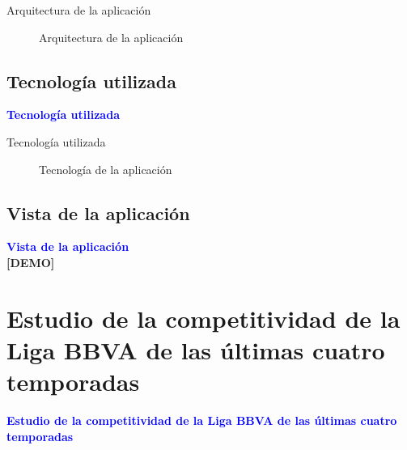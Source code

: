 \documentclass[10pt]{beamer}
\begin{document}
	\begin{frame}{Arquitectura de la aplicación}
		\begin{figure}
			\centering
			\resizebox{!}{0.7\textheight}{\arquitectura}
			\caption{Arquitectura de la aplicación}
			\label{fig:arquitectura}
		\end{figure}
	\end{frame}
	
	\subsection{Tecnología utilizada}
	
	\begin{frame}
		\begin{center}
			\Huge\textbf{\textsf{\textcolor{blue}{Tecnología utilizada}}}
		\end{center}
	\end{frame}
	
	\begin{frame}{Tecnología utilizada}
		\begin{figure}
			\centering
			\resizebox{!}{0.7\textheight}{\tecnologia}
			\caption{Tecnología de la aplicación}
			\label{fig:tecnologia}
		\end{figure}
	\end{frame}
	
	\subsection{Vista de la aplicación}
	
	\begin{frame}
		\begin{center}
			\Huge\textbf{\textsf{\textcolor{blue}{Vista de la aplicación}}}\\
	
			\Huge\textbf{\textsf{{[DEMO]}}}
		\end{center}
	\end{frame}
	

	\section{Estudio de la competitividad de la Liga BBVA de las últimas cuatro temporadas}
	
	\begin{frame}
		\begin{center}
			\Huge\textbf{\textsf{\textcolor{blue}{Estudio de la competitividad de la Liga BBVA de las últimas cuatro temporadas}}}
		\end{center}
	\end{frame}	
	
\end{document}
